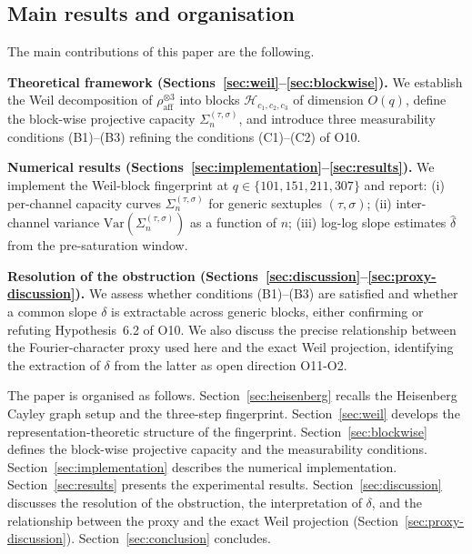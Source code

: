 \documentclass[11pt,a4paper]{article}
\newcommand{\rhoaff}{\rho_{\mathrm{aff}}}
\newcommand{\Sigblock}{\Sigma_n^{(\tau,\sigma)}}
\begin{document}
  \subsection{Main results and organisation}
    \label{sec:intro-results}

    The main contributions of this paper are the following.

    \textbf{Theoretical framework (Sections~\ref{sec:weil}--\ref{sec:blockwise}).}
    We establish the Weil decomposition of $\rhoaff^{\otimes 3}$ into blocks
    $\mathcal{H}_{c_1,c_2,c_3}$ of dimension $O(q)$, define the block-wise projective capacity
    $\Sigblock$, and introduce three measurability conditions (B1)--(B3) refining the conditions
    (C1)--(C2) of O10.

    \textbf{Numerical results (Sections~\ref{sec:implementation}--\ref{sec:results}).}
    We implement the Weil-block fingerprint at $q \in \{101, 151, 211, 307\}$ and report:
    (i) per-channel capacity curves $\Sigblock$ for generic sextuples $(\tau,\sigma)$;
    (ii) inter-channel variance $\mathrm{Var}(\Sigblock)$ as a function of $n$;
    (iii) log-log slope estimates $\hat\delta$ from the pre-saturation window.

    \textbf{Resolution of the obstruction (Sections~\ref{sec:discussion}--\ref{sec:proxy-discussion}).}
    We assess whether conditions (B1)--(B3) are satisfied and whether a common slope $\delta$
    is extractable across generic blocks, either confirming or refuting Hypothesis~6.2 of O10.
    We also discuss the precise relationship between the Fourier-character proxy used here and
    the exact Weil projection, identifying the extraction of $\delta$ from the latter as open
    direction O11-O2.

    The paper is organised as follows.
    Section~\ref{sec:heisenberg} recalls the Heisenberg Cayley graph setup and the three-step
    fingerprint.
    Section~\ref{sec:weil} develops the representation-theoretic structure of the fingerprint.
    Section~\ref{sec:blockwise} defines the block-wise projective capacity and the measurability
    conditions.
    Section~\ref{sec:implementation} describes the numerical implementation.
    Section~\ref{sec:results} presents the experimental results.
    Section~\ref{sec:discussion} discusses the resolution of the obstruction, the interpretation
    of $\delta$, and the relationship between the proxy and the exact Weil projection
    (Section~\ref{sec:proxy-discussion}).
    Section~\ref{sec:conclusion} concludes.
\end{document}
